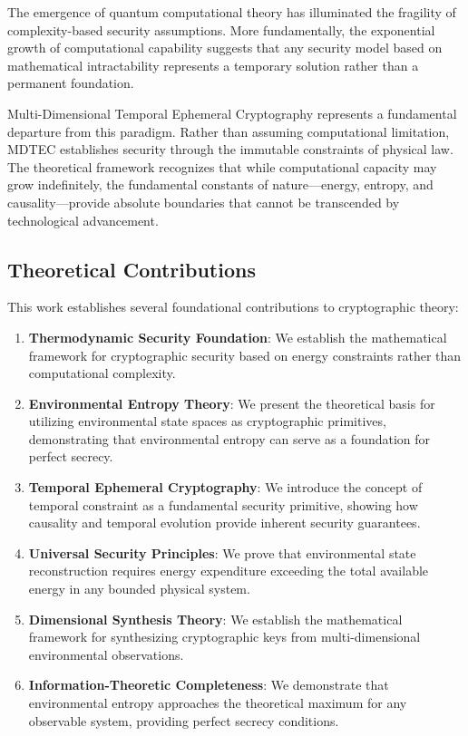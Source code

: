 \documentclass[12pt]{article}
\begin{document}
The emergence of quantum computational theory has illuminated the fragility of complexity-based security assumptions. More fundamentally, the exponential growth of computational capability suggests that any security model based on mathematical intractability represents a temporary solution rather than a permanent foundation.

Multi-Dimensional Temporal Ephemeral Cryptography represents a fundamental departure from this paradigm. Rather than assuming computational limitation, MDTEC establishes security through the immutable constraints of physical law. The theoretical framework recognizes that while computational capacity may grow indefinitely, the fundamental constants of nature—energy, entropy, and causality—provide absolute boundaries that cannot be transcended by technological advancement.

\subsection{Theoretical Contributions}

This work establishes several foundational contributions to cryptographic theory:

\begin{enumerate}
\item \textbf{Thermodynamic Security Foundation}: We establish the mathematical framework for cryptographic security based on energy constraints rather than computational complexity.

\item \textbf{Environmental Entropy Theory}: We present the theoretical basis for utilizing environmental state spaces as cryptographic primitives, demonstrating that environmental entropy can serve as a foundation for perfect secrecy.

\item \textbf{Temporal Ephemeral Cryptography}: We introduce the concept of temporal constraint as a fundamental security primitive, showing how causality and temporal evolution provide inherent security guarantees.

\item \textbf{Universal Security Principles}: We prove that environmental state reconstruction requires energy expenditure exceeding the total available energy in any bounded physical system.

\item \textbf{Dimensional Synthesis Theory}: We establish the mathematical framework for synthesizing cryptographic keys from multi-dimensional environmental observations.

\item \textbf{Information-Theoretic Completeness}: We demonstrate that environmental entropy approaches the theoretical maximum for any observable system, providing perfect secrecy conditions.
\end{enumerate}
\end{document}
